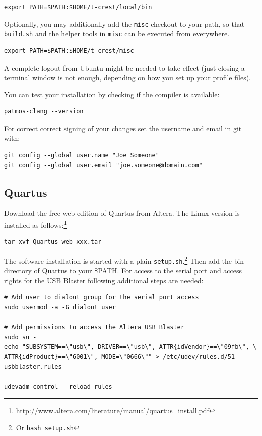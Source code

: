 \documentclass[a4paper,fontsize=10pt,twoside,DIV15,BCOR12mm,headinclude=true,footinclude=false,pagesize,bibtotoc]{scrbook}
\newcommand{\code}[1]{{\texttt{#1}}}
\newcommand{\comment}[3]{

\textsf{\textbf{#1}} {\color{#3}#2}}
\newcommand{\stefan}[1]{\comment{Stefan}{#1}{RoyalPurple}}
\renewcommand{\stefan}[1]{}
\begin{document}
\stefan{Relative paths should actually work, but the \textasciitilde{} shortcut is shell-specific and may not work, but
not sure about this.}

\begin{verbatim}
export PATH=$PATH:$HOME/t-crest/local/bin
\end{verbatim}

Optionally, you may additionally add the \code{misc} checkout to your path, so that \code{build.sh} and the helper tools in 
\code{misc} can be executed from everywhere.

\begin{verbatim}
export PATH=$PATH:$HOME/t-crest/misc
\end{verbatim}

A complete logout from Ubuntu might be needed to take effect (just closing
a terminal window is not enough, depending on how you set up your profile files).

You can test your installation by checking if the compiler is available:

\begin{verbatim}
patmos-clang --version
\end{verbatim}

For correct correct signing of your changes set the username and
email in git with:

\begin{verbatim}
git config --global user.name "Joe Someone"
git config --global user.email "joe.someone@domain.com"
\end{verbatim}

\subsection{Quartus}

Download the free web edition of Quartus from Altera. The Linux version is
installed as follows:\footnote{\url{http://www.altera.com/literature/manual/quartus_install.pdf}}

\begin{verbatim}
tar xvf Quartus-web-xxx.tar
\end{verbatim}

The software installation is started with a plain \code{setup.sh}.\footnote{Or \code{bash setup.sh}}
Then add the bin directory of Quartus to your \$PATH.
%
For access to the serial port and access rights for the USB Blaster following additional steps are needed:

\begin{verbatim}
# Add user to dialout group for the serial port access
sudo usermod -a -G dialout user

# Add permissions to access the Altera USB Blaster
sudo su -
echo "SUBSYSTEM==\"usb\", DRIVER==\"usb\", ATTR{idVendor}==\"09fb\", \
ATTR{idProduct}==\"6001\", MODE=\"0666\"" > /etc/udev/rules.d/51-usbblaster.rules

udevadm control --reload-rules
\end{verbatim}
\end{document}
